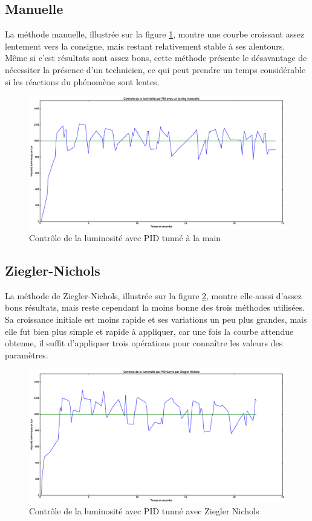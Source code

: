 \documentclass[a4paper,10pt]{report}
\begin{document}
\subsection{Manuelle}
La méthode manuelle, illustrée sur la figure \ref{fig:manuelle}, montre une courbe croissant assez lentement vers la consigne, mais restant relativement stable à ses alentours. Même si c'est résultats sont assez bons, cette méthode présente le désavantage de nécessiter la présence d'un technicien, ce qui peut prendre un temps considérable si les réactions du phénomène sont lentes.
\begin{figure}[hb!]
   \centering
   \includegraphics[scale=0.35]{Manuelle.eps}
   \caption{\label{fig:manuelle} Contrôle de la luminosité avec PID tunné à la main}
\end{figure}

\subsection{Ziegler-Nichols}
La méthode de Ziegler-Nichols, illustrée sur la figure \ref{fig:ziegler}, montre elle-aussi d'assez bons résultats, mais reste cependant la moins bonne des trois méthodes utilisées.
Sa croissance initiale est moins rapide et ses variations un peu plus grandes, mais elle fut bien plus simple et rapide à appliquer, car une fois la courbe attendue obtenue, il suffit d'appliquer trois opérations pour connaître les valeurs des paramètres.
\begin{figure}[hb!]
   \centering
   \includegraphics[scale=0.35]{Ziegler.eps}
   \caption{\label{fig:ziegler} Contrôle de la luminosité avec PID tunné avec Ziegler Nichols}
\end{figure}
\end{document}
